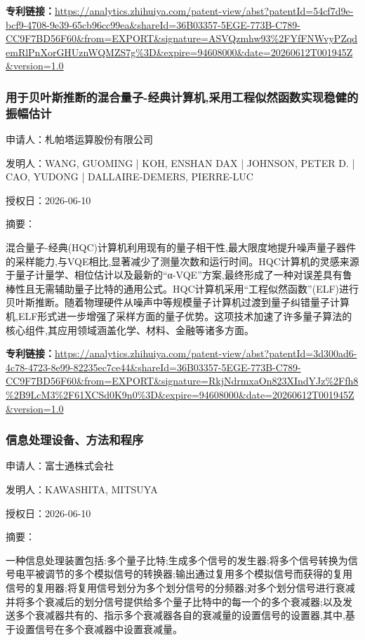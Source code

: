 \documentclass[12pt,a4paper]{ctexart}
\begin{document}
\noindent\textbf{专利链接：}\url{https://analytics.zhihuiya.com/patent-view/abst?patentId=54cf7d9e-bcf9-4708-9e39-65cb96cc99ea&shareId=36B03357-5EGE-773B-C789-CC9F7BD56F60&from=EXPORT&signature=ASVQzmhw93%2FYfFNWvyPZqdemRlPnXorGHUznWQMZS7g%3D&expire=94608000&date=20260612T001945Z&version=1.0}

\subsubsection{ 用于贝叶斯推断的混合量子-经典计算机,采用工程似然函数实现稳健的振幅估计 }

申请人：札帕塔运算股份有限公司

发明人：WANG, GUOMING | KOH, ENSHAN DAX | JOHNSON, PETER D. | CAO, YUDONG | DALLAIRE-DEMERS, PIERRE-LUC

授权日：2026-06-10

摘要：

混合量子-经典(HQC)计算机利用现有的量子相干性,最大限度地提升噪声量子器件的采样能力,与VQE相比,显著减少了测量次数和运行时间。HQC计算机的灵感来源于量子计量学、相位估计以及最新的“α-VQE”方案,最终形成了一种对误差具有鲁棒性且无需辅助量子比特的通用公式。HQC计算机采用“工程似然函数”(ELF)进行贝叶斯推断。随着物理硬件从噪声中等规模量子计算机过渡到量子纠错量子计算机,ELF形式进一步增强了采样方面的量子优势。这项技术加速了许多量子算法的核心组件,其应用领域涵盖化学、材料、金融等诸多方面。

\noindent\textbf{专利链接：}\url{https://analytics.zhihuiya.com/patent-view/abst?patentId=3d300ad6-4c78-4723-8e99-82235ec7ce44&shareId=36B03357-5EGE-773B-C789-CC9F7BD56F60&from=EXPORT&signature=RkjNdrmxaOn823XIndYJz%2Ffh8%2B9LcM3%2F61XCSd0K9n0%3D&expire=94608000&date=20260612T001945Z&version=1.0}

\subsubsection{ 信息处理设备、方法和程序 }

申请人：富士通株式会社

发明人：KAWASHITA, MITSUYA

授权日：2026-06-10

摘要：

一种信息处理装置包括:多个量子比特;生成多个信号的发生器;将多个信号转换为信号电平被调节的多个模拟信号的转换器;输出通过复用多个模拟信号而获得的复用信号的复用器;将复用信号划分为多个划分信号的分频器;对多个划分信号进行衰减并将多个衰减后的划分信号提供给多个量子比特中的每一个的多个衰减器;以及发送多个衰减器共有的、指示多个衰减器各自的衰减量的设置信号的设置器,其中,基于设置信号在多个衰减器中设置衰减量。
\end{document}
